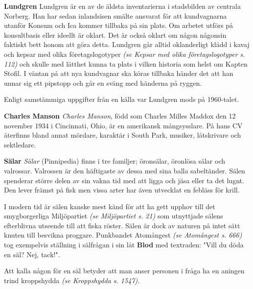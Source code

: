 \documentclass[a5paper, twoside]{book}
\begin{document}
\small{
\textbf{Lundgren}
Lundgren är en av de äldsta inventarierna i stadsbilden av centrala Norberg. Han har sedan inlandsisen smälte ansvarat för att kundvagnarna utanför Konsum och Ica kommer tillbaka på sin plats. Om arbetet utförs på konsultbasis eller ideellt är oklart. Det är också oklart om någon någonsin faktiskt bett honom att göra detta. Lundgren går alltid oklanderligt klädd i kavaj och kepsar med olika företagslogotyper \textsl{(se Kepsar med olika företagslogotyper s. 112)} och skulle med lätthet kunna ta plats i vilken historia som helst om Kapten Stofil. I väntan på att nya kundvagnar ska köras tillbaka händer det att han unnar sig ett pipstopp och går en sväng med händerna på ryggen.

Enligt samstämmiga uppgifter från en källa var Lundgren mods på 1960-talet.
}


\small{
\textbf{Charles Manson}
\label{charles_manson}
\textit{Charles Manson}, född som Charles Milles Maddox den 12 november 1934 i Cincinnati, Ohio, är en amerikansk mångsysslare. På hans CV återfinns bland annat mördare, karaktär i South Park, musiker, låtskrivare och sektledare.
}

\small{
\textbf{Sälar}
\label{sälar}
\textit{Sälar} (Pinnipedia)  finns i tre familjer; öronsälar, öronlösa sälar och valrossar. Valrossen är den häftigaste av dessa med sina balla sabeltänder. Sälen spenderar större delen av sin vakna tid med att ligga och jäsa eller ta det lugnt. Den lever främst på fisk men vissa arter har även utvecklat en febläss för krill.

I modern tid är sälen kanske mest känd för att ha gett upphov till det smygborgerliga Miljöpartiet \textsl{(se Miljöpartiet s. 21)} som utnyttjade sälens efterblivna utseende till att fiska röster. Sälen är dock av naturen på intet sätt knuten till besvikna proggare. Punkbandet Atomångest \textsl{(se Atomångest s. 666)} tog exempelvis ställning i sälfrågan i sin låt \textbf{Blod} med textraden: "Vill du döda en säl? Nej, tack!".

Att kalla någon för en säl betyder att man anser personen i fråga ha en aningen trind kroppshydda \textsl{(se Kroppshydda s. 1547)}.
}



\backmatter

\setlength{\parindent}{2em}
\footnotesize{
\printindex[saker]
}

\setlength{\parindent}{2em}
\footnotesize{
\printindex[andrasaker]
}

\setlength{\parindent}{2em}
\footnotesize{
\printindex
}
\end{document}
